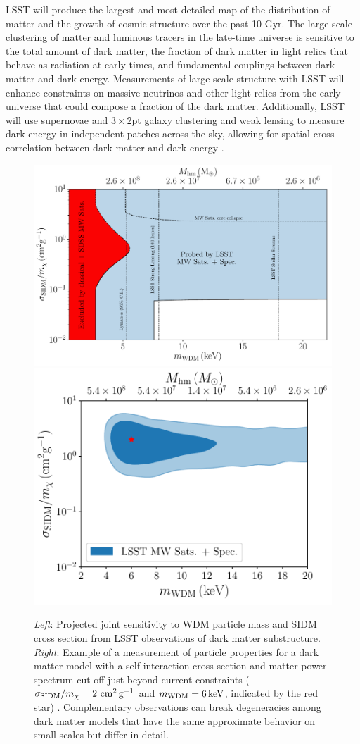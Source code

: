 \documentclass[12pt]{article}
\begin{document}
 LSST will produce the largest and most detailed map of the distribution of matter and the growth of cosmic structure over the past 10 Gyr.
The large-scale clustering of matter and luminous tracers in the late-time universe is sensitive to the total amount of dark matter, the fraction of dark matter in light relics that behave as radiation at early times, and fundamental couplings between dark matter and dark energy.
Measurements of large-scale structure with LSST will enhance constraints on massive neutrinos and other light relics from the early universe that could compose a fraction of the dark matter.
Additionally, LSST will use supernovae and $3\times2$pt galaxy clustering and weak lensing to measure dark energy in independent patches across the sky, allowing for spatial cross correlation between dark matter and dark energy \citep{0902.2590}.

\begin{figure}[t]
\centering
\includegraphics[width=0.53\columnwidth]{figures/SIDM_WDM_figw_coll.pdf}
\includegraphics[width=0.46\columnwidth]{figures/WDM_SIDM_discovery_test.pdf}
\caption{\emph{Left}: Projected joint sensitivity to WDM particle mass and SIDM cross section from LSST observations of dark matter substructure. 
\emph{Right}: Example of a measurement of particle properties for a dark matter model with a self-interaction cross section and matter power spectrum cut-off just beyond current constraints ($\sigma_{\rm SIDM}/m_\chi = 2 \mathrm{\,\mathrm{\,cm}^2\mathrm{\,g}^{-1}}$ and $m_{\rm WDM} = 6\mathrm{\,keV}$, indicated by the red star) \citep{drlica-wagner_2019_lsst_dark_matter}. Complementary observations can break degeneracies among dark matter models that have the same approximate behavior on small scales but differ in detail.}
\end{figure}
\end{document}
